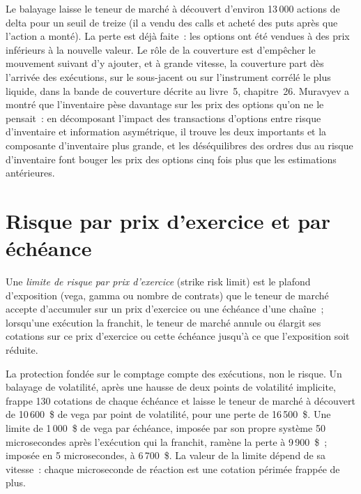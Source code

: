 Le balayage laisse le teneur de marché à découvert d'environ 13\,000 actions de delta pour un seuil de treize (il a vendu des calls et acheté des puts après
que l'action a monté). La perte est déjà faite~: les options ont été vendues à des prix inférieurs à la nouvelle valeur. Le rôle de la couverture est d'empêcher le mouvement suivant d'y ajouter, et à
grande vitesse, la couverture part dès l'arrivée des exécutions, sur le sous-jacent ou sur l'instrument corrélé le plus liquide, dans la bande de couverture
décrite au livre~5, chapitre~26. Muravyev a montré que l'inventaire pèse davantage sur les prix des options qu'on ne le pensait~: en décomposant l'impact des
transactions d'options entre risque d'inventaire et information asymétrique, il trouve les deux importants et la composante d'inventaire plus grande, et les déséquilibres des ordres dus au
risque d'inventaire font bouger les prix des options cinq fois plus que les estimations antérieures.

\section{Risque par prix d'exercice et par échéance}

\begin{definition}\label{def:hf:automated-options-market-making:strike}
Une \emph{limite de risque par prix d'exercice} (strike risk limit) est le plafond d'exposition (vega, gamma ou nombre de contrats) que le teneur de marché accepte d'accumuler sur un
prix d'exercice ou une échéance d'une chaîne~; lorsqu'une exécution la franchit, le teneur de marché annule ou élargit ses cotations sur ce prix d'exercice ou cette échéance jusqu'à ce que
l'exposition soit réduite.
\end{definition}

La protection fondée sur le comptage compte des exécutions, non le risque. Un balayage de volatilité, après une hausse de deux points de volatilité implicite, frappe 130 cotations de chaque
échéance et laisse le teneur de marché à découvert de 10\,600~\$ de vega par point de volatilité, pour une perte de 16\,500~\$. Une limite de 1\,000~\$ de vega par
échéance, imposée par son propre système 50 microsecondes après l'exécution qui la franchit, ramène la perte à 9\,900~\$~; imposée en 5 microsecondes, à
6\,700~\$. La valeur de la limite dépend de sa vitesse~: chaque microseconde de réaction est une cotation périmée frappée de plus.

